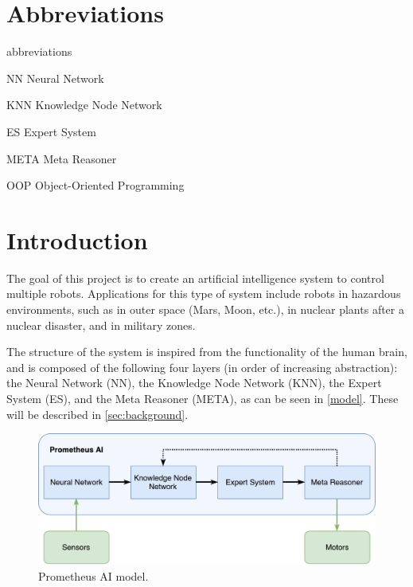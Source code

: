 \documentclass[titlepage,11pt]{article}
\begin{document}
\clearpage
\tableofcontents
\clearpage

\twocolumn

\section*{Abbreviations}

\begin{labeling}{abbreviations}
\item [NN] Neural Network
\item [KNN] Knowledge Node Network
\item [ES] Expert System
\item [META] Meta Reasoner
\item [OOP] Object-Oriented Programming
\end{labeling}

\section{Introduction} \label{sec:intro}

The goal of this project is to create an artificial intelligence system to control multiple robots. Applications for this type of system include robots in hazardous environments, such as in outer space (Mars, Moon, etc.), in nuclear plants after a nuclear disaster, and in military zones.

The structure of the system is inspired from the functionality of the human brain, and is composed of the following four layers (in order of increasing abstraction): the Neural Network (NN), the Knowledge Node Network (KNN), the Expert System (ES), and the Meta Reasoner (META), as can be seen in \autoref{model}. These will be described in \autoref{sec:background}.

\begin{figure}[!htb]
	\includegraphics[width=\columnwidth]{figures/ai_model.pdf}
	\caption{Prometheus AI model.}
	\label{model}
\end{figure}
\end{document}
